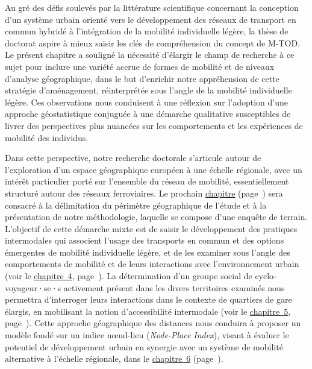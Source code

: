 \begin{refsegment}
Au gré des défis soulevés par la littérature scientifique concernant la conception d'un système urbain orienté vers le développement des réseaux de transport en commun hybridé à l'intégration de la mobilité individuelle légère, la thèse de doctorat aspire à mieux saisir les clés de compréhension du concept de \acrshort{M-TOD}. Le présent chapitre a souligné la nécessité d'élargir le champ de recherche à ce sujet pour inclure une variété accrue de formes de mobilité et de niveaux d'analyse géographique, dans le but d'enrichir notre appréhension de cette stratégie d'aménagement, réinterprétée sous l'angle de la mobilité individuelle légère. Ces observations nous conduisent à une réflexion sur l'adoption d'une approche géostatistique conjuguée à une démarche qualitative susceptibles de livrer des perspectives plus nuancées sur les comportements et les expériences de mobilité des individus.%

Dans cette perspective, notre recherche doctorale s'articule autour de l'exploration d'un espace géographique européen à une échelle régionale, avec un intérêt particulier porté sur l'ensemble du réseau de mobilité, essentiellement structuré autour des réseaux ferroviaires. Le prochain \hyperref[chap3:titre]{chapitre} (page~\pageref{chap3:titre}) sera consacré à la délimitation du périmètre géographique de l'étude et à la présentation de notre méthodologie, laquelle se compose d'une enquête de terrain. L'objectif de cette démarche mixte est de saisir le développement des pratiques intermodales qui associent l'usage des transports en commun et des options émergentes de mobilité individuelle légère, et de les examiner sous l'angle des comportements de mobilité et de leurs interactions avec l'environnement urbain (voir le \hyperref[chap4:titre]{chapitre~4}, page~\pageref{chap4:titre}). La détermination d'un groupe social de cyclo-voyageur·se·s activement présent dans les divers territoires examinés nous permettra d'interroger leurs interactions dans le contexte de quartiers de gare élargis, en mobilisant la notion d'accessibilité intermodale (voir le \hyperref[chap5:titre]{chapitre~5}, page~\pageref{chap5:titre}). Cette approche géographique des distances nous conduira à proposer un modèle fondé sur un indice nœud-lieu (\textsl{Node-Place Index}), visant à évaluer le potentiel de développement urbain en synergie avec un système de mobilité alternative à l'échelle régionale, dans le \hyperref[chap6:titre]{chapitre~6} (page~\pageref{chap6:titre}).%


\end{refsegment}
